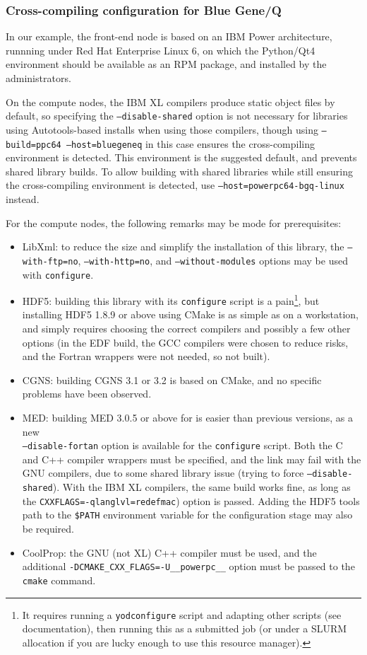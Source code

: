 \documentclass[a4paper,10pt,twoside]{csshortdoc}
\begin{document}
\subsubsection{Cross-compiling configuration for Blue Gene/Q}

In our example, the front-end node is based on an IBM Power architecture,
runnning under Red Hat Enterprise Linux 6, on which the Python/Qt4
environment should be available as an RPM package, and installed by the
administrators.

On the compute nodes, the IBM XL compilers produce static object files
by default, so specifying the \texttt{--disable-shared} option is not necessary
for libraries using Autotools-based installs when using those compilers,
though using \texttt{--build=ppc64 --host=bluegeneq} in this case ensures
the cross-compiling environment is detected. This environment
is the suggested default, and prevents shared library builds.
To allow building with shared libraries while still ensuring the
cross-compiling environment is detected,
use \texttt{--host=powerpc64-bgq-linux} instead.

For the compute nodes, the following remarks may be mode for prerequisites:

\begin{itemize}
\item LibXml: to reduce the size and simplify the installation of this
library, the \texttt{--with-ftp=no}, \texttt{--with-http=no},
and \texttt{--without-modules} options may be used with \texttt{configure}.
\item HDF5: building this library with its \texttt{configure} script
is a pain\footnote{It requires running a \texttt{yodconfigure}
script and adapting other scripts (see documentation), then running
this as a submitted job (or under a SLURM allocation if you are lucky
enough to use this resource manager).}, but installing HDF5 1.8.9 or above
using CMake is as simple as on a workstation, and simply requires
choosing the correct compilers and possibly a few other options (in
the EDF \CS build, the GCC compilers were chosen to reduce risks, and
the Fortran wrappers were not needed, so not built).
\item CGNS: building CGNS 3.1 or 3.2 is based on CMake, and no specific
problems have been observed.
\item MED: building MED 3.0.5 or above for \CS is easier than previous versions,
as a new \\ \texttt{--disable-fortan} option is available for the
\texttt{configure} script. Both the C and C++ compiler wrappers
must be specified, and the link may fail with the GNU compilers, due
to some shared library issue (trying to force \texttt{--disable-shared}).
With the IBM XL compilers, the same build works fine, as long as the
\texttt{CXXFLAGS=-qlanglvl=redefmac}) option is passed. Adding
the HDF5 tools path to the \texttt{\$PATH} environment variable for
the  configuration stage may also be required.
\item CoolProp: the GNU (not XL) C++ compiler must be used, and the additional
\texttt{-DCMAKE\_CXX\_FLAGS=-U\_\_powerpc\_\_} option must be passed to
the \texttt{cmake} command.
\end{itemize}
\end{document}
